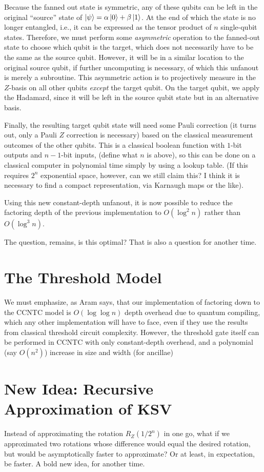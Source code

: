 \documentclass{article}
\begin{document}
Because the fanned out state is symmetric, any of these qubits can be
left in the original ``source'' state of
$\left\vert{\psi}\right\rangle = \alpha\left\vert{0}\right\rangle + \beta\left\vert{1}\right\rangle$.
At the end of which the
state is no longer entangled, i.e., it can be expressed as the
tensor product of $n$ single-qubit states. Therefore, we must perform
some \emph{asymmetric} operation to the fanned-out state to choose
which qubit is the target, which does not necessarily have to be the
same as the source qubit. However, it will be in a similar location
to the original source qubit, if further uncomputing is necessary,
of which this unfanout is merely a subroutine. This asymmetric action
is to projectively measure in the $Z$-basis on all other qubits
\emph{except} the target qubit. On the target qubit, we apply the
Hadamard, since it will be left in the source qubit state but in
an alternative basis.

Finally, the resulting target qubit state will need some Pauli
correction (it turns out, only a Pauli $Z$ correction is necessary)
based on the classical measurement outcomes of the other qubits.
This is a classical boolean function with $1$-bit outputs and
$n-1$-bit inputs, (define what $n$ is above), so this can be
done on a classical computer in polynomial time simply by using
a lookup table. (If this requires $2^n$ exponential space, however,
can we still claim this? I think it is necessary to find a compact
representation, via Karnaugh maps or the like).

Using this new constant-depth unfanout, it is now possible to reduce
the factoring depth of the previous implementation to $O(\log ^2 n)$
rather than $O(\log^3 n)$.

The question, remains, is this optimal? That is also a question for
another time.

\section{The Threshold Model}

We must emphasize, as Aram says, that our implementation of factoring
down to the CCNTC model is $O(\log \log n)$ depth overhead due to
quantum compiling, which any other implementation will have to face,
even if they use the results from classical threshold circuit complexity.
However, the threshold gate itself can be performed in CCNTC with only
constant-depth overhead, and a polynomial (say $O(n^2)$) increase in
size and width (for ancillae)

\section{New Idea: Recursive Approximation of KSV}

Instead of approximating the rotation $R_Z(1/2^n)$ in one go, what if
we approximated two rotations whose difference would equal the
desired rotation, but would be asymptotically faster to approximate?
Or at least, in expectation, be faster. A bold new idea, for another time.
\end{document}
